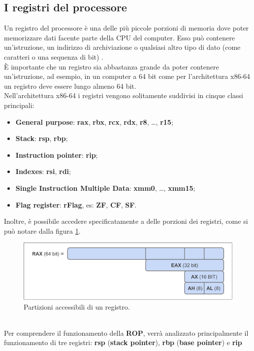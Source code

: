 \subsection{I registri del processore}
\label{subsec:registers}
Un registro del processore è una delle più piccole porzioni di memoria dove poter memorizzare dati facente parte della CPU del computer.
Esso può contenere un'istruzione, un indirizzo di archiviazione o qualsiasi altro tipo di dato (come caratteri o una sequenza di bit) \cite{Register-definition}.\\
È importante che un registro sia abbastanza grande da poter contenere un'istruzione, ad esempio, in un computer a 64 bit come per l'architettura x86-64 un registro deve 
essere lungo almeno 64 bit.\\
Nell'architettura x86-64 i registri vengono solitamente suddivisi in cinque classi principali:
\begin{itemize}
    \item \textbf{General purpose}: \textbf{rax}, \textbf{rbx}, \textbf{rcx}, \textbf{rdx},  \textbf{r8}, \dots, \textbf{r15};
    \item \textbf{Stack}: \textbf{rsp}, \textbf{rbp};
    \item \textbf{Instruction pointer}: \textbf{rip};
    \item \textbf{Indexes}: \textbf{rsi}, \textbf{rdi};
    \item \textbf{Single Instruction Multiple Data}: \textbf{xmm0}, \dots, \textbf{xmm15};
    \item \textbf{Flag register}: \textbf{rFlag}, es: \textbf{ZF}, \textbf{CF}, \textbf{SF}.
\end{itemize}
Inoltre, è possibile accedere specificatamente a delle porzioni dei registri, come si può notare dalla figura \ref{fig:register-partition}.
\begin{figure}[ht]
    \centerline{\includegraphics[scale=.6]{images/register-partition.png}}
    \caption{Partizioni accessibili di un registro.}
    \label{fig:register-partition}
\end{figure}
\\Per comprendere il funzionamento della \textbf{ROP}, verrà analizzato principalmente il funzionamento di tre registri: \textbf{rsp} (\textbf{stack pointer}), \textbf{rbp} (\textbf{base pointer}) e \textbf{rip}
